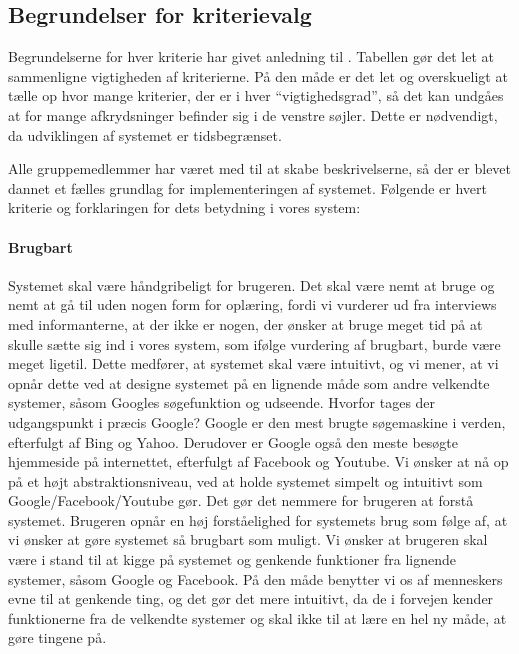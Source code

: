 \subsection{Begrundelser for kriterievalg}

Begrundelserne for hver kriterie har givet anledning til  . Tabellen gør det let at sammenligne vigtigheden af kriterierne. På den måde er det let og overskueligt at tælle op hvor mange kriterier, der er i hver ``vigtighedsgrad'', så det kan undgåes at for mange afkrydsninger befinder sig i de venstre søjler. Dette er nødvendigt, da udviklingen af systemet er tidsbegrænset.  

Alle gruppemedlemmer har været med til at skabe beskrivelserne, så der er blevet dannet et fælles grundlag for implementeringen af systemet. Følgende er hvert kriterie og forklaringen for dets betydning i vores system:

\paragraph{Brugbart} Systemet skal være håndgribeligt for brugeren. Det skal være nemt at bruge og nemt at gå til uden nogen form for oplæring, fordi vi vurderer ud fra interviews med informanterne, at der ikke er nogen, der ønsker at bruge meget tid på at skulle sætte sig ind i vores system, som ifølge vurdering af brugbart, burde være meget ligetil. Dette medfører, at systemet skal være intuitivt, og vi mener, at vi opnår dette ved at designe systemet på en lignende måde som andre velkendte systemer, såsom Googles søgefunktion og udseende. Hvorfor tages der udgangspunkt i præcis Google? Google er den mest brugte søgemaskine i verden, efterfulgt af Bing og Yahoo.\cite{googlesoeg} \cite{ebizmba} Derudover er Google også den meste besøgte hjemmeside på internettet, efterfulgt af Facebook og Youtube. \cite{alexadk} Vi ønsker at nå op på et højt abstraktionsniveau, ved at holde systemet simpelt og intuitivt som Google/Facebook/Youtube gør. Det gør det nemmere for brugeren at forstå systemet. Brugeren opnår en høj forståelighed for systemets brug som følge af, at vi ønsker at gøre systemet så brugbart som muligt. Vi ønsker at brugeren skal være i stand til at kigge på systemet og genkende funktioner fra lignende systemer, såsom Google og Facebook. På den måde benytter vi os af menneskers evne til at genkende ting, og det gør det mere intuitivt, da de i forvejen kender funktionerne fra de velkendte systemer og skal ikke til at lære en hel ny måde, at gøre tingene på.

